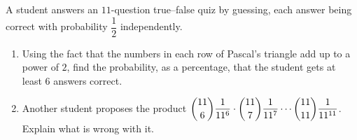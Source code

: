 A student answers an $11$-question true--false quiz by guessing, each answer being correct with probability $\dfrac12$ independently.
\begin{enumerate}
\item[(a)] Using the fact that the numbers in each row of Pascal's triangle add up to a power of $2$, find the probability, as a percentage, that the student gets at least $6$ answers correct.
\item[(b)] Another student proposes the product $\dbinom{11}{6}\dfrac{1}{11^6}\cdot\dbinom{11}{7}\dfrac{1}{11^7}\cdots\dbinom{11}{11}\dfrac{1}{11^{11}}$. Explain what is wrong with it.
\end{enumerate}
